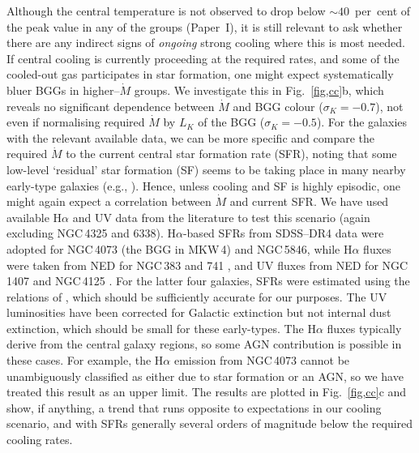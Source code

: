 \documentclass[useAMS,usenatbib]{mn2e}
\begin{document}
Although the central temperature is not observed to drop below $\sim
40$~per~cent of the peak value in any of the groups (Paper~I), it is
still relevant to ask whether there are any indirect signs of {\em
ongoing} strong cooling where this is most needed. If central cooling
is currently proceeding at the required rates, and some of the
cooled-out gas participates in star formation, one might expect
systematically bluer BGGs in higher--$\dot M$ groups. We investigate
this in Fig.~\ref{fig,cc}b, which reveals no significant dependence
between $\dot M$ and BGG colour ($\sigma_K=-0.7$), not even if
normalising required $\dot M$ by $L_K$ of the BGG ($\sigma_K=-0.5$).
For the galaxies with the relevant available data, we can be more
specific and compare the required $\dot M$ to the current central star
formation rate (SFR), noting that some low-level `residual' star
formation (SF) seems to be taking place in many nearby early-type
galaxies (e.g., \citealt*{comb07}). Hence, unless cooling and SF is
highly episodic, one might again expect a correlation between $\dot M$
and current SFR. We have used available H$\alpha$ and UV data from the
literature to test this scenario (again excluding NGC\,4325 and
6338). H$\alpha$-based SFRs from SDSS--DR4 data \citep{brin04} were
adopted for NGC\,4073 (the BGG in MKW\,4) and NGC\,5846, while
H$\alpha$ fluxes were taken from NED for NGC\,383 and 741
\citep*{cape05}, and UV fluxes from NED for NGC\,1407 \citep*{rifa95}
and NGC\,4125 \citep{dale07}. For the latter four galaxies, SFRs were
estimated using the relations of \citet{kenn98}, which should be
sufficiently accurate for our purposes. The UV luminosities have been
corrected for Galactic extinction but not internal dust extinction,
which should be small for these early-types. The H$\alpha$ fluxes
typically derive from the central galaxy regions, so some AGN
contribution is possible in these cases. For example, the H$\alpha$
emission from NGC\,4073 cannot be unambiguously classified as either
due to star formation or an AGN, so we have treated this result as an
upper limit. The results are plotted in Fig.~\ref{fig,cc}c and show,
if anything, a trend that runs opposite to expectations in our cooling
scenario, and with SFRs generally several orders of magnitude below
the required cooling rates.
\end{document}

